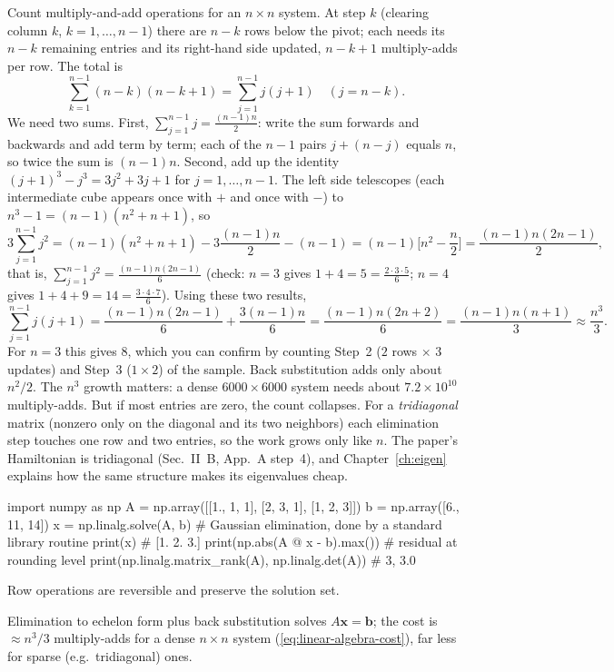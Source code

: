 Count multiply-and-add operations for an $n\times n$ system. At step $k$ (clearing column $k$, $k=1,\dots,n-1$) there are $n-k$ rows below the pivot; each needs its $n-k$ remaining entries and its right-hand side updated, $n-k+1$ multiply-adds per row. The total is
\[
\sum_{k=1}^{n-1}(n-k)(n-k+1)=\sum_{j=1}^{n-1}j(j+1)\quad(j=n-k).
\]
We need two sums. First, $\sum_{j=1}^{n-1}j=\frac{(n-1)n}2$: write the sum forwards and backwards and add term by term; each of the $n-1$ pairs $j+(n-j)$ equals $n$, so twice the sum is $(n-1)n$. Second, add up the identity $(j+1)^3-j^3=3j^2+3j+1$ for $j=1,\dots,n-1$. The left side telescopes (each intermediate cube appears once with $+$ and once with $-$) to $n^3-1=(n-1)(n^2+n+1)$, so
\[
3\sum_{j=1}^{n-1}j^2=(n-1)(n^2+n+1)-3\frac{(n-1)n}2-(n-1)=(n-1)\Big[n^2-\frac n2\Big]=\frac{(n-1)n(2n-1)}2 ,
\]
that is, $\sum_{j=1}^{n-1}j^2=\frac{(n-1)n(2n-1)}6$ (check: $n=3$ gives $1+4=5=\frac{2\cdot3\cdot5}6$; $n=4$ gives $1+4+9=14=\frac{3\cdot4\cdot7}6$). Using these two results,
\begin{equation}
\sum_{j=1}^{n-1}j(j+1)=\frac{(n-1)n(2n-1)}6+\frac{3(n-1)n}6=\frac{(n-1)n(2n+2)}6=\frac{(n-1)n(n+1)}3\approx\frac{n^3}3 .
\label{eq:linear-algebra-cost}
\end{equation}
For $n=3$ this gives $8$, which you can confirm by counting Step~2 ($2$ rows $\times$ $3$ updates) and Step~3 ($1\times2$) of the sample. Back substitution adds only about $n^2/2$. The $n^3$ growth matters: a dense $6000\times6000$ system needs about $7.2\times10^{10}$ multiply-adds. But if most entries are zero, the count collapses. For a \emph{tridiagonal} matrix (nonzero only on the diagonal and its two neighbors) each elimination step touches one row and two entries, so the work grows only like $n$. The paper's Hamiltonian is tridiagonal (Sec.~II~B, App.~A step~4), and Chapter~\ref{ch:eigen} explains how the same structure makes its eigenvalues cheap.

\begin{pycode}
import numpy as np
A = np.array([[1., 1, 1], [2, 3, 1], [1, 2, 3]])
b = np.array([6., 11, 14])
x = np.linalg.solve(A, b)        # Gaussian elimination, done by a standard library routine
print(x)                         # [1. 2. 3.]
print(np.abs(A @ x - b).max())   # residual at rounding level
print(np.linalg.matrix_rank(A), np.linalg.det(A))   # 3, 3.0
\end{pycode}

\begin{keyideas}
\item Row operations are reversible and preserve the solution set.
\item Elimination to echelon form plus back substitution solves $A\bm x=\bm b$; the cost is $\approx n^3/3$ multiply-adds for a dense $n\times n$ system (\cref{eq:linear-algebra-cost}), far less for sparse (e.g.\ tridiagonal) ones.
\end{keyideas}


